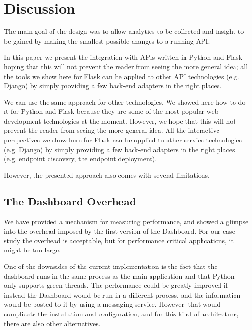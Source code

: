 
\section{Discussion}



  The main goal of the \tool design was to allow analytics to be collected and insight to be gained by making the smallest possible changes to a running API. 

  In this paper we present the integration with APIs written in Python and Flask hoping that this will not prevent the reader from seeing the more general idea; all the tools we show here for Flask can be applied to other API technologies (e.g. Django) by simply providing a few back-end adapters in the right places.


  We can use the same approach for other technologies. We showed here how to do it for Python and Flask because they are some of the most popular web development technologies at the moment. However, we hope that this will not prevent the reader from seeing the more general idea. All the interactive perspectives we show here for Flask can be applied to other service technologies (e.g. Django) by simply providing a few back-end adapters in the right places (e.g. endpoint discovery, the  endpoint deployment). 

  However, the presented approach also comes with several limitations.

  \subsection*{The Dashboard Overhead}

    We have provided a mechanism for measuring performance, and showed a glimpse into the overhead imposed by the first version of the Dashboard. For our case study the overhead is acceptable, but for performance critical applications, it might be too large. 

    One of the downsides of the current implementation is the fact that the dashboard runs in the same process as the main application and that Python only supports green threads. The performance could be greatly improved if instead the Dashboard would be run in a different process, and the information would be posted to it by using a messaging service. However, that would complicate the installation and configuration, and for this kind of architecture, there are also other alternatives.


